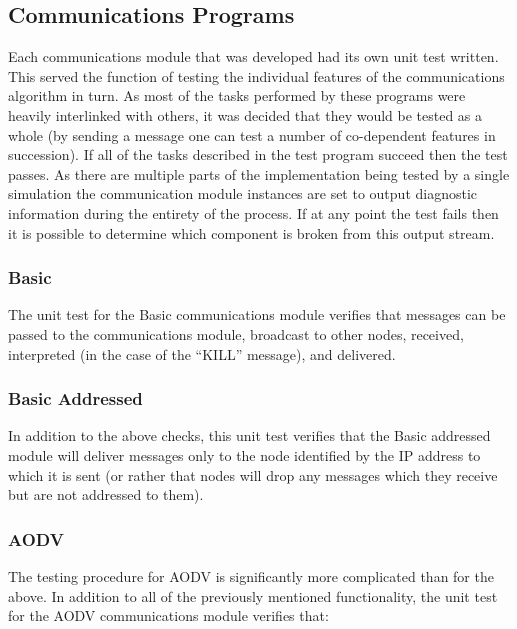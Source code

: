 \subsection{Communications Programs}
Each communications module that was developed had its own unit test written. This served the function of testing the individual features of the communications algorithm in turn. As most of the tasks performed by these programs were heavily interlinked with others, it was decided that they would be tested as a whole (by sending a message one can test a number of co-dependent features in succession). If all of the tasks described in the test program succeed then the test passes. As there are multiple parts of the implementation being tested by a single simulation the communication module instances are set to output diagnostic information during the entirety of the process. If at any point the test fails then it is possible to determine which component is broken from this output stream.

\subsubsection{Basic}
The unit test for the Basic communications module verifies that messages can be passed to the communications module, broadcast to other nodes, received, interpreted (in the case of the ``KILL'' message), and delivered.

\subsubsection{Basic Addressed}
In addition to the above checks, this unit test verifies that the Basic addressed module will deliver messages only to the node identified by the IP address to which it is sent (or rather that nodes will drop any messages which they receive but are not addressed to them).

\subsubsection{AODV}
The testing procedure for AODV is significantly more complicated than for the above. In addition to all of the previously mentioned functionality, the unit test for the AODV communications module verifies that:

